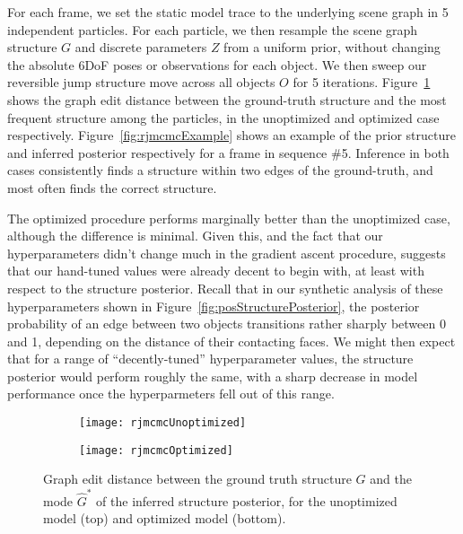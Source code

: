 For each frame, we set the static model trace to the underlying scene graph in 5 independent particles.
For each particle, we then resample the scene graph structure $G$ and discrete parameters $Z$ from a uniform prior, without changing the absolute 6DoF poses or observations for each object.
We then sweep our reversible jump structure move across all objects $O$ for 5 iterations.
Figure~\ref{fig:rjmcmcResults} shows the graph edit distance between the ground-truth structure and the most frequent structure among the particles, in the unoptimized and optimized case respectively.
Figure~\ref{fig:rjmcmcExample} shows an example of the prior structure and inferred posterior respectively for a frame in sequence \#5.
Inference in both cases consistently finds a structure within two edges of the ground-truth, and most often finds the correct structure.

The optimized procedure performs marginally better than the unoptimized case, although the difference is minimal.
Given this, and the fact that our hyperparameters didn't change much in the gradient ascent procedure, suggests that our hand-tuned values were already decent to begin with, at least with respect to the structure posterior.
Recall that in our synthetic analysis of these hyperparameters shown in Figure~\ref{fig:posStructurePosterior}, the posterior probability of an edge between two objects transitions rather sharply between 0 and 1, depending on the distance of their contacting faces.
We might then expect that for a range of ``decently-tuned'' hyperparameter values, the structure posterior would perform roughly the same, with a sharp decrease in model performance once the hyperparmeters fell out of this range.

\begin{figure}[H]
  \centering
  \begin{subfigure}[b]{0.75\textwidth}
    \centering
    \texttt{[image: rjmcmcUnoptimized]}
  \end{subfigure}
  \begin{subfigure}[b]{0.75\textwidth}
    \centering
    \texttt{[image: rjmcmcOptimized]}
  \end{subfigure}
  \caption{
    Graph edit distance between the ground truth structure $G$ and the mode $\hat{G}^*$ of the inferred structure posterior, for the unoptimized model (top) and optimized model (bottom).
  }
  \label{fig:rjmcmcResults}
\end{figure}
